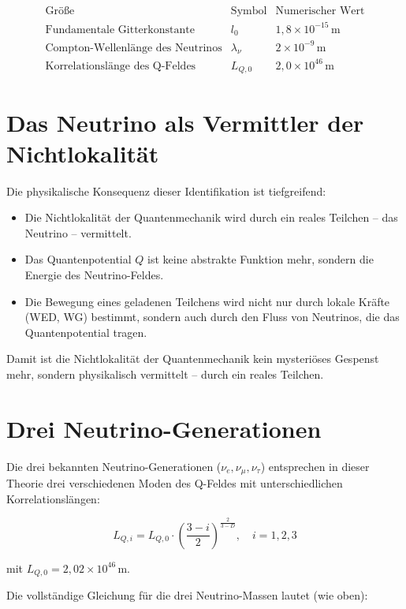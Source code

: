 \[
\begin{array}{l|c|c}
\text{Größe} & \text{Symbol} & \text{Numerischer Wert} \\
\hline
\text{Fundamentale Gitterkonstante} & l_0 & 1,8 \times 10^{-15} \, \text{m} \\
\text{Compton-Wellenlänge des Neutrinos} & \lambda_\nu & 2 \times 10^{-9} \, \text{m} \\
\text{Korrelationslänge des Q-Feldes} & L_{Q,0} & 2{,}0 \times 10^{46} \, \text{m}
\end{array}
\]

\section{Das Neutrino als Vermittler der Nichtlokalität}
\label{sec:nu_nichtlokalitaet}

Die physikalische Konsequenz dieser Identifikation ist tiefgreifend:

\begin{itemize}
    \item Die Nichtlokalität der Quantenmechanik wird durch ein reales Teilchen – das Neutrino – vermittelt.
    \item Das Quantenpotential \( Q \) ist keine abstrakte Funktion mehr, sondern die Energie des Neutrino-Feldes.
    \item Die Bewegung eines geladenen Teilchens wird nicht nur durch lokale Kräfte (WED, WG) bestimmt, sondern auch durch den Fluss von Neutrinos, die das Quantenpotential tragen.
\end{itemize}

Damit ist die Nichtlokalität der Quantenmechanik kein mysteriöses Gespenst mehr, sondern physikalisch vermittelt – durch ein reales Teilchen.

\section{Drei Neutrino-Generationen}
\label{sec:nu_generationen}

Die drei bekannten Neutrino-Generationen (\( \nu_e, \nu_\mu, \nu_\tau \)) entsprechen in dieser Theorie drei verschiedenen Moden des Q-Feldes mit unterschiedlichen Korrelationslängen:

\[
L_{Q,i} = L_{Q,0} \cdot \left(\frac{3-i}{2}\right)^{\frac{2}{3-D}}, \quad i = 1,2,3
\]

mit \( L_{Q,0} = 2{,}02 \times 10^{46} \, \text{m} \).

Die vollständige Gleichung für die drei Neutrino-Massen lautet (wie oben):

